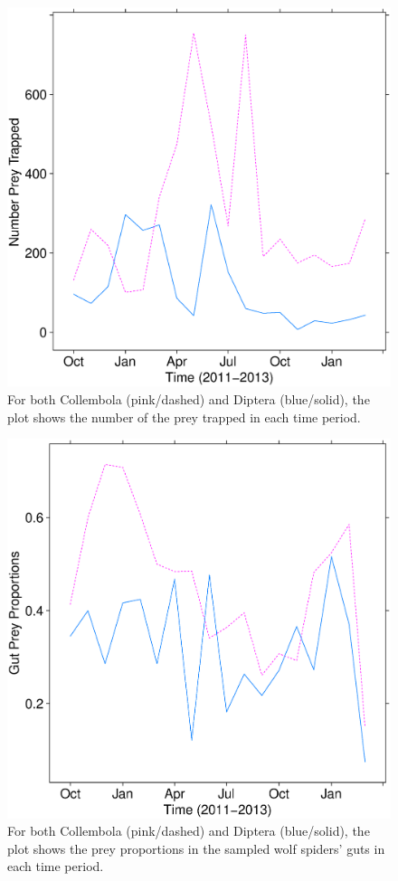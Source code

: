 \begin{figure}
  \centering
  \includegraphics[scale=0.35]{prey_trapped}
  \caption{For both Collembola (pink/dashed) and Diptera (blue/solid), the plot shows the number of the prey trapped in each time period.}
  \label{fig:trapped}
\end{figure}

\begin{figure}
  \centering
  \includegraphics[scale=0.35]{prey_props}
  \caption{For both Collembola (pink/dashed) and Diptera (blue/solid), the plot shows the prey proportions in the sampled wolf spiders' guts in each time period.}
  \label{fig:props}
\end{figure}


